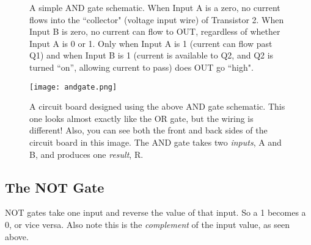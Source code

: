 \bigskip

\begin{figure}[h!]
\begin{center}


\caption{A simple AND gate schematic. When Input A is a zero, no current flows into the ``collector" (voltage input wire) of Transistor 2. When Input B is zero, no current can flow to OUT, regardless of whether Input A is 0 or 1. Only when Input A is 1 (current can flow past Q1) and when Input B is 1 (current is available to Q2, and Q2 is turned ``on'', allowing current to pass) does OUT go ``high".}

\end{center}
\end{figure}



\begin{figure}[h!]
\begin{center}
\texttt{[image: andgate.png]}
\caption{A circuit board designed using the above AND gate schematic. This one looks almost exactly like the OR gate, but the wiring is different! Also, you can see both the front and back sides of the circuit board in this image. The AND gate takes two \emph{inputs}, A and B, and produces one \emph{result}, R.}
\end{center}
\end{figure}


\clearpage
\newpage

\subsection*{The NOT Gate}

NOT gates take one input and reverse the value of that input. So a 1 becomes a 0, or vice versa. Also note this is the \emph{complement} of the input value, as seen above.

